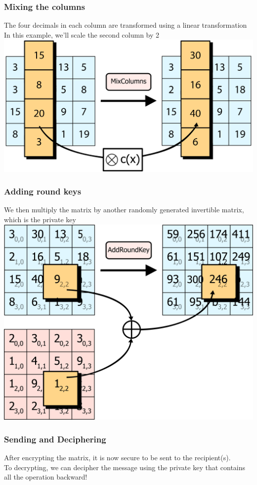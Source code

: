 \documentclass[11pt]{beamer}
\begin{document}
\begin{frame}\frametitle{Mixing the columns}
	The four decimals in each column are transformed using a linear transformation
	\center In this example, we'll scale the second column by 2
	\center \includegraphics[scale=0.05]{mix_column_1}
\end{frame}

\begin{frame}\frametitle{Adding round keys}
	We then multiply the matrix by another randomly generated invertible matrix, which is the private key
	\center \includegraphics[scale=0.25]{add_round_key}
\end{frame}

\begin{frame}\frametitle{Sending and Deciphering}
	After encrypting the matrix, it is now secure to be sent to the recipient(s).\\
	To decrypting, we can decipher the message using the private key that contains all the operation backward!
\end{frame}
\end{document}
